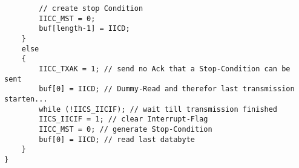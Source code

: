 \begin{lstlisting}
        // create stop Condition
        IICC_MST = 0;
        buf[length-1] = IICD;
    }
    else
    {
        IICC_TXAK = 1; // send no Ack that a Stop-Condition can be sent
        buf[0] = IICD; // Dummy-Read and therefor last transmission  starten...
        while (!IICS_IICIF); // wait till transmission finished
        IICS_IICIF = 1; // clear Interrupt-Flag
        IICC_MST = 0; // generate Stop-Condition
        buf[0] = IICD; // read last databyte
    }
}
\end{lstlisting}